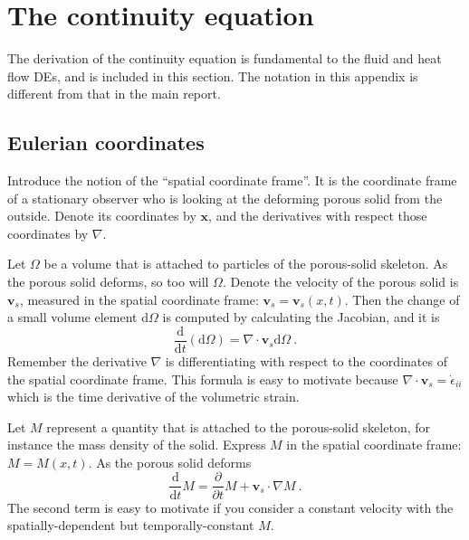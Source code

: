 \documentclass[12pt]{report}
\def\d{\mathrm{d}}
\begin{document}

\appendix

\chapter{The continuity equation}

The derivation of the continuity equation is fundamental to the fluid
and heat flow DEs, and is
included in this section.  The notation in this appendix is different
from that in the main report.

\section{Eulerian coordinates}

Introduce the notion of the ``spatial coordinate frame''.  It is the
coordinate frame of a stationary observer who is looking at the
deforming porous solid from the outside.  Denote its coordinates by
${\mathbf x}$, and the derivatives with respect those coordinates by
$\nabla$.

Let $\Omega$ be a volume that is attached to particles of the
porous-solid skeleton.  As the porous solid deforms, so too will
$\Omega$.  Denote the velocity of the porous solid is ${\mathbf
  v}_{s}$, measured in the spatial coordinate frame: ${\mathbf v}_{s}
= {\mathbf v}_{s}(x, t)$.  Then the change of a small volume element
$\d\Omega$ is computed by calculating the Jacobian, and it is
\begin{equation}
\frac{\d}{\d t} (\d\Omega) = \nabla\cdot{\mathbf v}_{s} \d\Omega \ .
\end{equation}
Remember the derivative $\nabla$ is differentiating with respect to
the coordinates of the spatial coordinate frame.  This formula is easy
to motivate because $\nabla\cdot{\mathbf v}_{s} = \dot{\epsilon}_{ii}$
which is the time derivative of the volumetric strain.

Let $M$ represent a quantity that is attached to the porous-solid
skeleton, for instance the mass density of the solid.  Express $M$ in
the spatial coordinate frame: $M=M(x, t)$.  As the porous
solid deforms
\begin{equation}
\frac{\d}{\d t}M = \frac{\partial}{\partial t}M + {\mathbf v}_{s}\cdot
\nabla M \ .
\end{equation}
The second term is easy to motivate if you consider a constant
velocity with the spatially-dependent but temporally-constant $M$.
\end{document}
